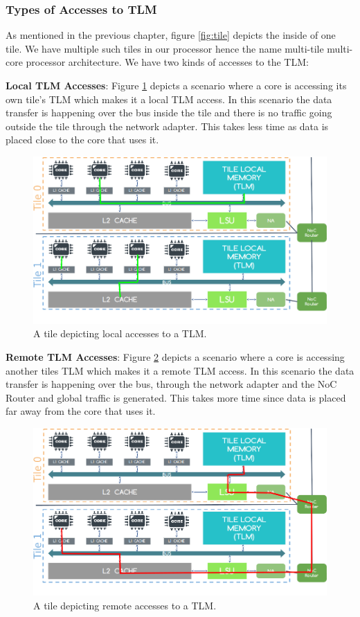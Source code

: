 \documentclass{listhesis}
\begin{document}
\subsubsection{Types of Accesses to TLM}
As mentioned in the previous chapter, figure \ref{fig:tile} depicts the inside of one tile. We have multiple such tiles in our processor hence the name multi-tile multi-core processor architecture. We have two kinds of accesses to the TLM:\\
\par
\textbf{Local TLM Accesses}: Figure \ref{fig:localaccesses} depicts a scenario where a core is accessing its own tile's TLM which makes it a local TLM access. In this scenario the data transfer is happening over the bus inside the tile and there is no traffic going outside the tile through the network adapter. This takes less time as data is placed close to the core that uses it. \\
\begin{figure}
  \includegraphics[width=\linewidth]{localaccesses.png}
  \centering
  \caption{A tile depicting local accesses to a TLM.}
  \label{fig:localaccesses}
\end{figure}
\par
\textbf{Remote TLM Accesses}: Figure \ref{fig:remoteaccesses} depicts a scenario where a core is accessing another tiles TLM which makes it a remote TLM access. In this scenario the data transfer is happening over the bus, through the network adapter and the NoC Router and global traffic is generated. This takes more time since data is placed far away from the core that uses it. 
\begin{figure}
  \includegraphics[width=\linewidth]{remoteaccesses.png}
  \centering
  \caption{A tile depicting remote accesses to a TLM.}
  \label{fig:remoteaccesses}
\end{figure}
\end{document}
